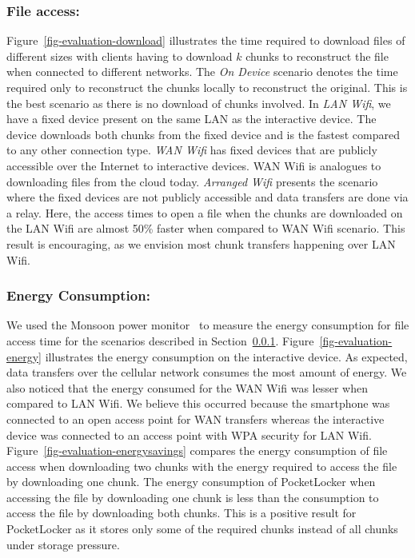 \subsubsection{File access:\space} \label{sec-fileaccess}
Figure~\ref{fig-evaluation-download} illustrates the time required to
download files of different sizes with clients having to download $k$ chunks
to reconstruct the file when connected to different networks. The \textit{On
Device} scenario denotes the time required only to reconstruct the chunks
locally to reconstruct the original. This is the best scenario as there is no
download of chunks involved. In \textit{LAN Wifi}, we have a fixed device
present on the same LAN as the interactive device. The device downloads both
chunks from the fixed device and is the fastest compared to any other
connection type. \textit{WAN Wifi} has fixed devices that are publicly
accessible over the Internet to interactive devices. WAN Wifi is analogues to
downloading files from the cloud today. \textit{Arranged Wifi} presents the
scenario where the fixed devices are not publicly accessible and data
transfers are done via a relay. Here, the access times to open a file when
the chunks are downloaded on the LAN Wifi are almost 50\% faster when
compared to WAN Wifi scenario. This result is encouraging, as we envision
most chunk transfers happening over LAN Wifi.

\subsubsection{Energy Consumption:\space} We used the Monsoon power
monitor~\cite{monsoon} to measure the energy consumption for file access time
for the scenarios described in Section~\ref{sec-fileaccess}.
Figure~\ref{fig-evaluation-energy} illustrates the energy consumption on the
interactive device. As expected, data transfers over the cellular network
consumes the most amount of energy. We also noticed that the energy consumed
for the WAN Wifi was lesser when compared to LAN Wifi. We believe this
occurred because the smartphone was connected to an open access point for WAN
transfers whereas the interactive device was connected to an access point
with WPA security for LAN Wifi. Figure~\ref{fig-evaluation-energysavings}
compares the energy consumption of file access when downloading two chunks
with the energy required to access the file by downloading one chunk. The
energy consumption of PocketLocker when accessing the file by downloading one
chunk is less than the consumption to access the file by downloading both
chunks. This is a positive result for PocketLocker as it stores only some of
the required chunks instead of all chunks under storage pressure.


